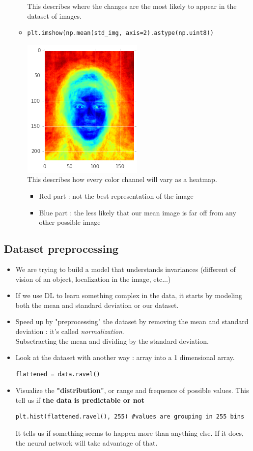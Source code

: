 \documentclass[12pt,a4paper]{article}
\begin{document}
\begin{itemize}
\begin{itemize}
This describes where the changes are the most likely to appear in the dataset of images.
\item \begin{lstlisting}
plt.imshow(np.mean(std_img, axis=2).astype(np.uint8))
\end{lstlisting}
\includegraphics[scale=0.5]{dataStdMean}\\
This describes how every color channel will vary as a heatmap.
\begin{itemize}
\item Red part : not the best representation of the image
\item Blue part : the less likely that our mean image is far off from any other possible image
\end{itemize}
\end{itemize}
\end{itemize}

\subsection{Dataset preprocessing}
\begin{itemize}
\item We are trying to build a model that understands invariances (different of vision of an object, localization in the image, etc...)
\item If we use DL to learn something complex in the data, it starts by modeling both the mean and standard deviation or our dataset.
\item Speed up by "preprocessing" the dataset by removing the mean and standard deviation : it's called \textit{normalization}.\\
Subsctracting the mean and dividing by the standard deviation.
\item Look at the dataset with another way : array into a 1 dimensional array.
\begin{lstlisting}
flattened = data.ravel()
\end{lstlisting}
\item Visualize the \textbf{"distribution"}, or range and frequence of possible values. This tell us if \textbf{the data is predictable or not}
\begin{lstlisting}
plt.hist(flattened.ravel(), 255) #values are grouping in 255 bins
\end{lstlisting}
It tells us if something seems to happen more than anything else. If it does, the neural network will take advantage of that.
\end{itemize}
\end{document}
